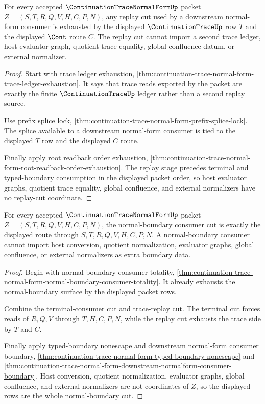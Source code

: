 \begin{theorem}
\label{thm:continuation-trace-normal-form-trace-replay-cut}
For every accepted $\ContinuationTraceNormalFormUp$ packet $Z=(S,T,R,Q,V,H,C,P,N)$, any replay cut used by a downstream normal-form consumer is exhausted by the displayed $\ContinuationTraceUp$ row $T$ and the displayed $\Cont$ route $C$. The replay cut cannot import a second trace ledger, host evaluator graph, quotient trace equality, global confluence datum, or external normalizer.
\end{theorem}
\begin{proof}
Start with trace ledger exhaustion, \autoref{thm:continuation-trace-normal-form-trace-ledger-exhaustion}. It says that trace reads exported by the packet are exactly the finite $\ContinuationTraceUp$ ledger rather than a second replay source.

Use prefix splice lock, \autoref{thm:continuation-trace-normal-form-prefix-splice-lock}. The splice available to a downstream normal-form consumer is tied to the displayed $T$ row and the displayed $C$ route.

Finally apply root readback order exhaustion, \autoref{thm:continuation-trace-normal-form-root-readback-order-exhaustion}. The replay stage precedes terminal and typed-boundary consumption in the displayed packet order, so host evaluator graphs, quotient trace equality, global confluence, and external normalizers have no replay-cut coordinate.
\end{proof}

\begin{theorem}
\label{thm:continuation-trace-normal-form-normal-boundary-cut}
For every accepted $\ContinuationTraceNormalFormUp$ packet $Z=(S,T,R,Q,V,H,C,P,N)$, the normal-boundary consumer cut is exactly the displayed route through $S,T,R,Q,V,H,C,P,N$. A normal-boundary consumer cannot import host conversion, quotient normalization, evaluator graphs, global confluence, or external normalizers as extra boundary data.
\end{theorem}
\begin{proof}
Begin with normal-boundary consumer totality, \autoref{thm:continuation-trace-normal-form-normal-boundary-consumer-totality}. It already exhausts the normal-boundary surface by the displayed packet rows.

Combine the terminal-consumer cut and trace-replay cut. The terminal cut forces reads of $R,Q,V$ through $T,H,C,P,N$, while the replay cut exhausts the trace side by $T$ and $C$.

Finally apply typed-boundary nonescape and downstream normal-form consumer boundary, \autoref{thm:continuation-trace-normal-form-typed-boundary-nonescape} and \autoref{thm:continuation-trace-normal-form-downstream-normalform-consumer-boundary}. Host conversion, quotient normalization, evaluator graphs, global confluence, and external normalizers are not coordinates of $Z$, so the displayed rows are the whole normal-boundary cut.
\end{proof}

